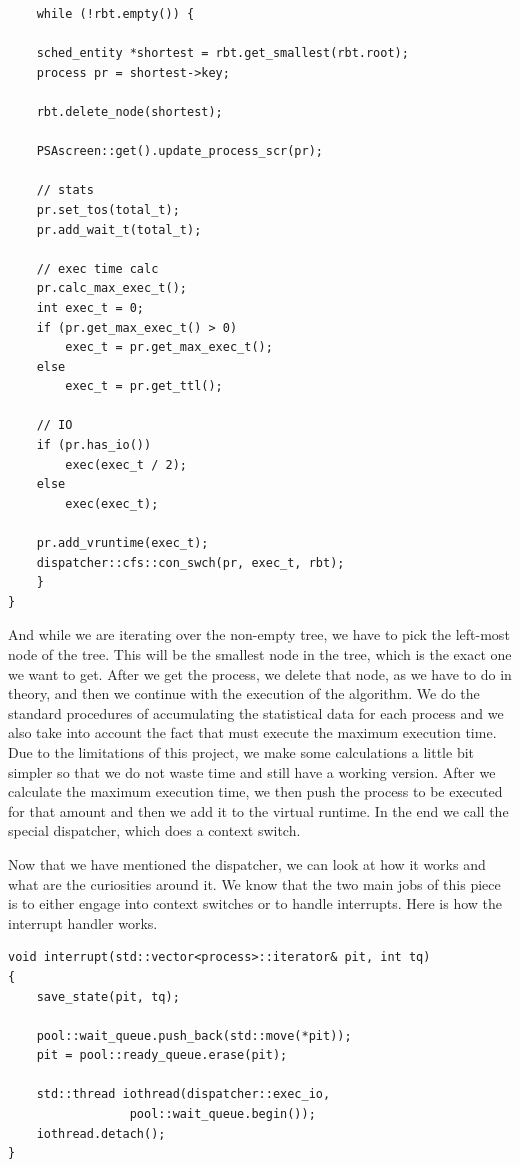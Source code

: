 \documentclass{article}
\begin{document}
\begin{lstlisting}
    while (!rbt.empty()) {

	sched_entity *shortest = rbt.get_smallest(rbt.root);
	process pr = shortest->key;

	rbt.delete_node(shortest);

	PSAscreen::get().update_process_scr(pr);

	// stats
	pr.set_tos(total_t);
	pr.add_wait_t(total_t);

	// exec time calc
	pr.calc_max_exec_t();
	int exec_t = 0;
	if (pr.get_max_exec_t() > 0)
	    exec_t = pr.get_max_exec_t();
	else
	    exec_t = pr.get_ttl();

	// IO
	if (pr.has_io())
	    exec(exec_t / 2);
	else
	    exec(exec_t);

	pr.add_vruntime(exec_t);
	dispatcher::cfs::con_swch(pr, exec_t, rbt);
    }
}
\end{lstlisting}

And while we are iterating over the non-empty tree, we have to pick the left-most node of the tree. This will be the smallest node in the tree, which is the exact one we want to get. After we get the process, we delete that node, as we have to do in theory, and then we continue with the execution of the algorithm. We do the standard procedures of accumulating the statistical data for each process and we also take into account the fact that must execute the maximum execution time. Due to the limitations of this project, we make some calculations a little bit simpler so that we do not waste time and still have a working version. After we calculate the maximum execution time, we then push the process to be executed for that amount and then we add it to the virtual runtime. In the end we call the special dispatcher, which does a context switch.

Now that we have mentioned the dispatcher, we can look at how it works and what are the curiosities around it. We know that the two main jobs of this piece is to either engage into context switches or to handle interrupts. Here is how the interrupt handler works.

\begin{lstlisting}
void interrupt(std::vector<process>::iterator& pit, int tq)
{
    save_state(pit, tq);

    pool::wait_queue.push_back(std::move(*pit));
    pit = pool::ready_queue.erase(pit);

    std::thread iothread(dispatcher::exec_io,
     		     pool::wait_queue.begin());
    iothread.detach();
}
\end{lstlisting}
\end{document}
